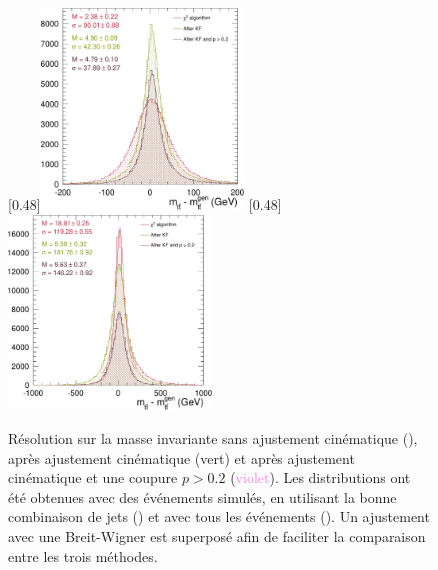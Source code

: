 \bigskip

\begin{figure}[tbp] \centering
    \subcaptionbox{\label{fig:kinfit_matched_events}}[0.48\textwidth]{\includegraphics[width=0.48\textwidth]{chapitre6/figs/kinfit/mtt_resolution_comparison_kf_good_solutions.pdf}} \hfill
    \subcaptionbox{\label{fig:kinfit_all_events}}[0.48\textwidth]{\includegraphics[width=0.48\textwidth]{chapitre6/figs/kinfit/mtt_resolution_comparison_kf_all_events.pdf}}
    \caption{Résolution sur la masse invariante \mtt sans ajustement cinématique (\rouge), après ajustement cinématique (\textcolor{vert}{vert}) et après ajustement cinématique et une coupure $p > \num{0.2}$ (\textcolor{violet}{violet}). Les distributions ont été obtenues avec des événements \ttbar simulés, en utilisant la bonne combinaison de jets () et avec tous les événements (). Un ajustement avec une Breit-Wigner est superposé afin de faciliter la comparaison entre les trois méthodes.}
    \label{fig:kinfit_ttbar}
\end{figure}

